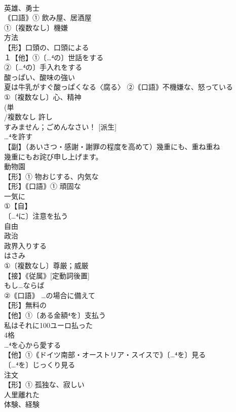 \documentclass[8pt]{extreport}
\begin{document}
\begin{CJK}{UTF8}{min}
\\	英雄、勇士
\\	｟口語｠① 飲み屋、居酒屋
\\	①〔複数なし〕機嫌 
\\	方法 
\\	【形】口頭の、口頭による 
\\	１【他】①〔…⁴の〕世話をする
\\	②〔…⁴の〕手入れをする
\\	酸っぱい、酸味の強い 
\\	夏は牛乳がすぐ酸っぱくなる〈腐る〉 ②｟口語｠不機嫌な、怒っている
\\	①〔複数なし〕心、精神 
\\	(単
\\	/複数なし 許し 
\\	すみません；ごめんなさい！ [派生] 
\\	…⁴を許す
\\	【副】（あいさつ・感謝・謝罪の程度を高めて）幾重にも、重ね重ね 
\\	幾重にもお詫び申し上げます。
\\	動物園 
\\	【形】① 物おじする、内気な
\\	【形】｟口語｠① 頑固な 
\\	一気に
\\	①【自】
\\	〔…⁴に〕注意を払う
\\	自由
\\	政治 
\\	政界入りする
\\	はさみ
\\	①〔複数なし〕尊厳；威厳
\\	【接】《従属》[定動詞後置] 
\\	もし…ならば
\\	②｟口語｠ …の場合に備えて
\\	【形】無料の 
\\	【他】①〔ある金額⁴を〕支払う
\\	私はそれに100ユーロ払った 
\\	4格 
\\	…⁴を心から愛する 
\\	【他】①｟ドイツ南部・オーストリア・スイスで｠〔…⁴を〕見る
\\	〔…⁴を〕じっくり見る
\\	注文
\\	【形】① 孤独な、寂しい
\\	人里離れた 
\\	体験、経験

\end{CJK}
\end{document}
